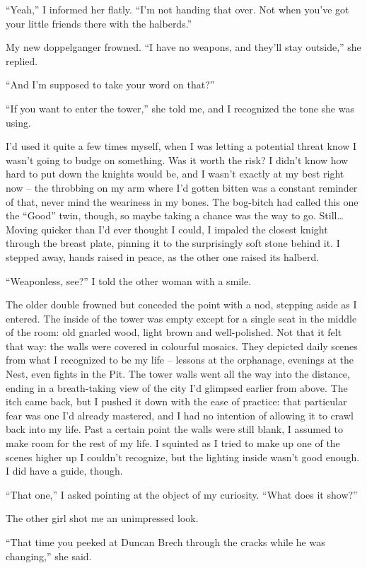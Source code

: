 \documentclass[12pt, openany]{book}
\begin{document}
“Yeah,” I informed her flatly. “I’m not handing that over. Not when you’ve got your little friends there with the halberds.”

My new doppelganger frowned. “I have no weapons, and they’ll stay outside,” she replied.

“And I’m supposed to take your word on that?”

“If you want to enter the tower,” she told me, and I recognized the tone she was using.

I’d used it quite a few times myself, when I was letting a potential threat know I wasn’t going to budge on something. Was it worth the risk? I didn’t know how hard to put down the knights would be, and I wasn’t exactly at my best right now – the throbbing on my arm where I’d gotten bitten was a constant reminder of that, never mind the weariness in my bones. The bog-bitch had called this one the “Good” twin, though, so maybe taking a chance was the way to go. Still… Moving quicker than I’d ever thought I could, I impaled the closest knight through the breast plate, pinning it to the surprisingly soft stone behind it. I stepped away, hands raised in peace, as the other one raised its halberd.

“Weaponless, see?” I told the other woman with a smile.

The older double frowned but conceded the point with a nod, stepping aside as I entered. The inside of the tower was empty except for a single seat in the middle of the room: old gnarled wood, light brown and well-polished. Not that it felt that way: the walls were covered in colourful mosaics. They depicted daily scenes from what I recognized to be my life – lessons at the orphanage, evenings at the Nest, even fights in the Pit. The tower walls went all the way into the distance, ending in a breath-taking view of the city I’d glimpsed earlier from above. The itch came back, but I pushed it down with the ease of practice: that particular fear was one I’d already mastered, and I had no intention of allowing it to crawl back into my life. Past a certain point the walls were still blank, I assumed to make room for the rest of my life. I squinted as I tried to make up one of the scenes higher up I couldn’t recognize, but the lighting inside wasn’t good enough. I did have a guide, though.

“That one,” I asked pointing at the object of my curiosity. “What does it show?”

The other girl shot me an unimpressed look.

“That time you peeked at Duncan Brech through the cracks while he was changing,” she said.
\end{document}
